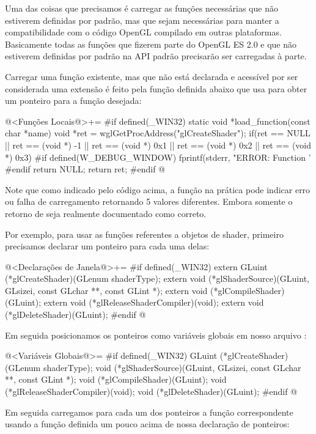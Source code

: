 Uma das coisas que precisamos é carregar as funções necessárias que
não estiverem definidas por padrão, mas que sejam necessárias para
manter a compatibilidade com o código OpenGL compilado em outras
plataformas. Basicamente todas as funções que fizerem parte do OpenGL
ES 2.0 e que não estiverem definidas por padrão na API padrão
precisarão ser carregadas à parte.

Carregar uma função existente, mas que não está declarada e acessível
por ser considerada uma extensão é feito pela função definida abaixo
que usa
 para obter um ponteiro para a função desejada:

\iniciocodigo
@<Funções Locais@>+=
#if defined(_WIN32)
static void *load_function(const char *name){
  void *ret = wglGetProcAddress("glCreateShader");
  if(ret == NULL || ret == (void *) -1 || ret == (void *) 0x1 ||
     ret == (void *) 0x2 || ret == (void *) 0x3){
#if defined(W_DEBUG_WINDOW)
    fprintf(stderr, "ERROR: Function '%
#endif
    return NULL;
  }
  return ret;
}
#endif
@
\fimcodigo

Note que como indicado pelo código acima, a
função  na prática pode indicar erro ou
falha de carregamento retornando 5 valores diferentes. Embora somente
o retorno de  seja realmente documentado como
correto.

Por exemplo, para usar as funções referentes a objetos de shader, primeiro
precisamos declarar um ponteiro para cada uma delas:

\iniciocodigo
@<Declarações de Janela@>+=
#if defined(_WIN32)
extern GLuint (*glCreateShader)(GLenum shaderType);
extern void (*glShaderSource)(GLuint, GLsizei, const GLchar **, const GLint *);
extern void (*glCompileShader)(GLuint);
extern void (*glReleaseShaderCompiler)(void);
extern void (*glDeleteShader)(GLuint);
#endif
@
\fimcodigo

Em seguida posicionamos os ponteiros como variáveis globais em nosso
arquivo :

\iniciocodigo
@<Variáveis Globais@>=
#if defined(_WIN32)
GLuint (*glCreateShader)(GLenum shaderType);
void (*glShaderSource)(GLuint, GLsizei, const GLchar **, const GLint *);
void (*glCompileShader)(GLuint);
void (*glReleaseShaderCompiler)(void);
void (*glDeleteShader)(GLuint);
#endif
@
\fimcodigo

Em seguida carregamos para cada um dos ponteiros a função
correspondente usando a função definida um pouco acima de nossa
declaração de ponteiros:

